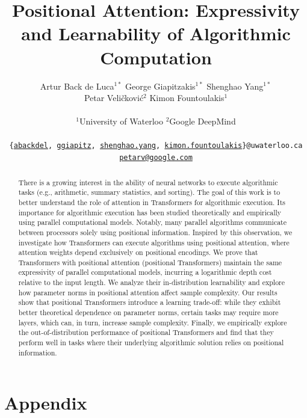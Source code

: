 \documentclass{article}
\title{Positional Attention: Expressivity and Learnability of Algorithmic Computation}
\author{
    Artur Back de Luca$^{1*}$\qquad
    George Giapitzakis$^{1*}$\qquad
    Shenghao Yang$^{1*}$\\
    Petar Veli\v{c}ković$^{2}$\qquad
    Kimon Fountoulakis$^{1}$\\
    \vspace{-1mm}\\
    \normalsize{$^1$University of Waterloo \quad $^2$Google DeepMind}\\
    \vspace{-3mm}\\
    \normalsize{\texttt{\{\href{mailto:abackdel@uwaterloo.ca}{abackdel}, \href{mailto:ggiapitz@uwaterloo.ca}{ggiapitz}, \href{mailto:shenghao.yang@uwaterloo.ca}{shenghao.yang}, \href{mailto:kimon.fountoulakis@uwaterloo.ca}{kimon.fountoulakis}\}@uwaterloo.ca}}\\
    \normalsize{\texttt{\href{mailto:petarv@google.com}{petarv@google.com}}}
}
\date{}
\theoremstyle{plain}
\theoremstyle{definition}
\theoremstyle{plain}
\begin{document}
\maketitle

\def\thefootnote{*}
\def\thefootnote{\arabic{footnote}}

\vspace{-5mm}

\begin{abstract}
    There is a growing interest in the ability of neural networks to execute algorithmic tasks (e.g., arithmetic, summary statistics, and sorting).
    The goal of this work is to better understand the role of attention in Transformers for algorithmic execution.
    Its importance for algorithmic execution has been studied theoretically and empirically using parallel computational models. Notably, many parallel algorithms communicate between processors solely using positional information. Inspired by this observation, we investigate how Transformers can execute algorithms using positional attention, where attention weights depend exclusively on positional encodings. We prove that Transformers with positional attention (positional Transformers) maintain the same expressivity of parallel computational models, incurring a logarithmic depth cost relative to the input length. We analyze their in-distribution learnability and explore how parameter norms in positional attention affect sample complexity. Our results show that positional Transformers introduce a learning trade-off: while they exhibit better theoretical dependence on parameter norms, certain tasks may require more layers, which can, in turn, increase sample complexity. Finally, we empirically explore the out-of-distribution performance of positional Transformers and find that they perform well in tasks where their underlying algorithmic solution relies on positional information.
\end{abstract}

%

\doparttoc %
\faketableofcontents %

%
\parttoc %

%














\newpage
\appendix

\part{Appendix} %
\parttoc %








\end{document}
